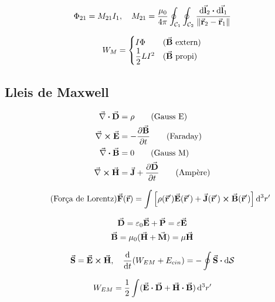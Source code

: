 \begin{align*}
	\Phi_{21} = M_{21} I_{1} \qc M_{21} = \frac{\mu_{0}}{4\pi} \oint_{\mc{C}_{1}} \oint_{\mc{C}_{2}} \frac{\dd{\va{l}_{2}} \vdot \dd{\va{l}_{1}}}{\norm{\va{r}_{2} - \va{r}_{1}}}
\end{align*}

\begin{align*}
	W_{M} = \begin{cases} I \Phi & (\va{B} \text{ extern}) \\ \dfrac{1}{2} L I^{2} & (\va{B} \text{ propi}) \end{cases}
\end{align*}
\subsection{Lleis de Maxwell}
\begin{align}
	\div{D} &= \rho                     \tag{Gauss E} \\
	\rot{E} &= -\pdv{\va{B}}{t}         \tag{Faraday} \\
	\div{B} &= 0                        \tag{Gauss M} \\
	\rot{H} &= \va{J} + \pdv{\va{D}}{t} \tag{Ampère}
\end{align}

\begin{align*}\tag{Força de Lorentz}
	\va{F}(\va{r}) = \int \qty[\rho(\va{r}') \va{E}(\va{r}') + \va{J}(\va{r}') \cross \va{B}(\va{r}')] \dd[3]{r'}
\end{align*}

\begin{align*}
\begin{gathered}
	\va{D} = \varepsilon_{0} \va{E} + \va{P} = \varepsilon \va{E} \\
	\va{B} = \mu_{0} (\va{H} + \va{M}) = \mu \va{H}
\end{gathered}
\end{align*}

\begin{align*}
	\va{S} = \va{E} \cross \va{H} \qc \dv{}{t} \qty(W_{EM} + E_{cin}) = - \oint \va{S} \vdot \dd{\mc{S}}
\end{align*}

\begin{align*}
	W_{EM} = \frac{1}{2} \int (\va{E}\vdot\va{D} + \va{H}\vdot\va{B}) \dd[3]{r'}
\end{align*}

